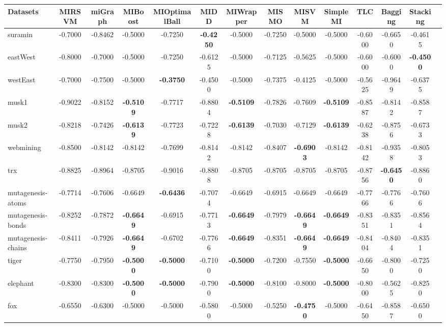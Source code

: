 \begin{threeparttable}
\begin{tabular}{lccccccccccccc}
\toprule
Datasets &MIRSVM &miGraph &MIBoost &MIOptimalBall &MIDD &MIWrapper &MISMO &MISVM &SimpleMI &TLC &Bagging &Stacking \\
\midrule
suramin &-0.7000 &-0.8462 &-0.5000 &-0.7250 &\textbf{-0.4250} &-0.5000 &-0.7250 &-0.5000 &-0.5000 &-0.6000 &-0.6650 &-0.4615 &  \\
eastWest &-0.8000 &-0.7000 &-0.5000 &-0.7250 &-0.6125 &-0.5000 &-0.7125 &-0.5625 &-0.5000 &-0.6000 &-0.6000 &\textbf{-0.4500} &  \\
westEast &-0.7000 &-0.7500 &-0.5000 &\textbf{-0.3750} &-0.4500 &-0.5000 &-0.7375 &-0.4125 &-0.5000 &-0.5625 &-0.9649 &-0.6375 &  \\
musk1 &-0.9022 &-0.8152 &\textbf{-0.5109} &-0.7717 &-0.8804 &\textbf{-0.5109} &-0.7826 &-0.7609 &\textbf{-0.5109} &-0.8587 &-0.8142 &-0.8587 &  \\
musk2 &-0.8218 &-0.7426 &\textbf{-0.6139} &-0.7723 &-0.7228 &\textbf{-0.6139} &-0.7030 &-0.7129 &\textbf{-0.6139} &-0.6238 &-0.8756 &-0.6733 &  \\
webmining &-0.8500 &-0.8142 &-0.8142 &-0.7699 &-0.8142 &-0.8142 &-0.8407 &\textbf{-0.6903} &-0.8142 &-0.8142 &-0.9358 &-0.8053 &  \\
trx &-0.8825 &-0.8964 &-0.8705 &-0.9016 &-0.8808 &-0.8705 &-0.8705 &-0.8705 &-0.8705 &-0.8756 &\textbf{-0.6450} &-0.8860 &  \\
mutagenesis-atoms &-0.7714 &-0.7606 &-0.6649 &\textbf{-0.6436} &-0.7074 &-0.6649 &-0.6915 &-0.6649 &-0.6649 &-0.7766 &-0.7766 &-0.7606 &  \\
mutagenesis-bonds &-0.8252 &-0.7872 &\textbf{-0.6649} &-0.6915 &-0.7713 &\textbf{-0.6649} &-0.7979 &\textbf{-0.6649} &\textbf{-0.6649} &-0.8351 &-0.8351 &-0.8564 &  \\
mutagenesis-chains &-0.8411 &-0.7926 &\textbf{-0.6649} &-0.6702 &-0.7766 &\textbf{-0.6649} &-0.8351 &\textbf{-0.6649} &\textbf{-0.6649} &-0.8404 &-0.8404 &-0.8351 &  \\
tiger &-0.7750 &-0.7950 &\textbf{-0.5000} &\textbf{-0.5000} &-0.7100 &\textbf{-0.5000} &-0.7200 &-0.7550 &\textbf{-0.5000} &-0.6650 &-0.8000 &-0.7250 &  \\
elephant &-0.8300 &-0.8300 &\textbf{-0.5000} &\textbf{-0.5000} &-0.7900 &\textbf{-0.5000} &-0.8100 &-0.8000 &\textbf{-0.5000} &-0.8000 &-0.5625 &-0.8250 &  \\
fox &-0.6550 &-0.6300 &-0.5000 &-0.5000 &-0.5800 &-0.5000 &-0.5250 &\textbf{-0.4750} &-0.5000 &-0.6450 &-0.8587 &-0.6500 &  \\

\end{tabular}
\end{threeparttable}
